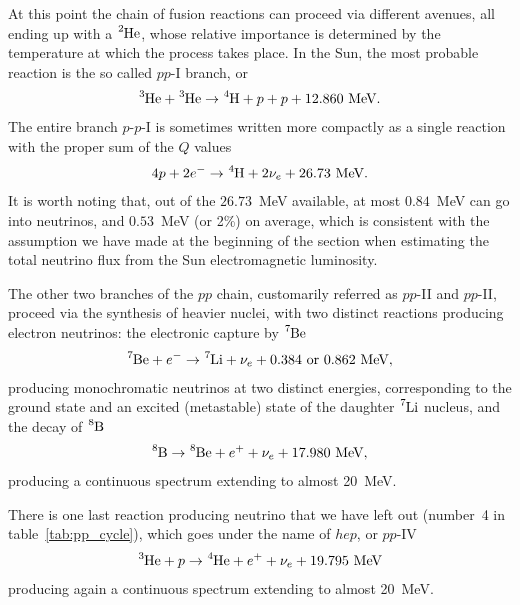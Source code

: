 At this point the chain of fusion reactions can proceed via different avenues, all
ending up with a $\ce{^2He}$, whose relative importance is determined by the temperature
at which the process takes place. In the Sun, the most probable reaction is the so
called $pp$-I branch, or
\begin{align*}
  \ce{^3He} + \ce{^3He} \rightarrow \ce{^4H} + p + p + 12.860~\text{MeV}.
\end{align*}
The entire branch $p$-$p$-I is sometimes written more compactly as a single
reaction with the proper sum of the $Q$ values
\begin{align*}
  4p + 2e^- \rightarrow \ce{^4H} + 2\nu_e + 26.73~\text{MeV}.
\end{align*}
It is worth noting that, out of the $26.73$~MeV available, at most $0.84$~MeV can
go into neutrinos, and $0.53$~MeV (or 2\%) on average, which is consistent with the
assumption we have made at the beginning of the section when estimating the total
neutrino flux from the Sun electromagnetic luminosity.

The other two branches of the $pp$ chain, customarily referred as $pp$-II and $pp$-II,
proceed via the synthesis of heavier nuclei, with two distinct reactions producing
electron neutrinos: the electronic capture by $\ce{^7Be}$
\begin{align*}
  \ce{^7Be} + e^- \rightarrow \ce{^7Li} + \nu_e + 0.384~\text{or}~0.862~\text{MeV},
\end{align*}
producing monochromatic neutrinos at two distinct energies,
corresponding to the ground state and an excited (metastable) state of the daughter
$\ce{^7Li}$ nucleus, and the decay of $\ce{^8B}$
\begin{align*}
  \ce{^8B} \rightarrow \ce{^8Be} + e^+ + \nu_e + 17.980~\text{MeV},
\end{align*}
producing a continuous spectrum extending to almost 20~MeV.

There is one last reaction producing neutrino that we have left out (number~4 in
table~\ref{tab:pp_cycle}), which goes under the name of $hep$, or $pp$-IV
\begin{align*}
  \ce{^3He} + p \rightarrow \ce{^4He} + e^+ + \nu_e + 19.795~\text{MeV}
\end{align*}
producing again a continuous spectrum extending to almost 20~MeV.


